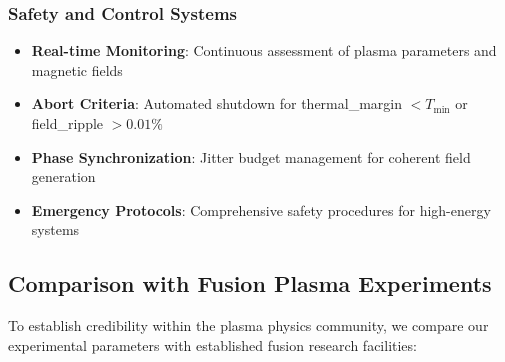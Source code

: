 \documentclass[10pt,twocolumn]{article}
\begin{document}
\subsubsection{Safety and Control Systems}
\begin{itemize}
\item \textbf{Real-time Monitoring}: Continuous assessment of plasma parameters and magnetic fields
\item \textbf{Abort Criteria}: Automated shutdown for thermal\_margin $< T_{\min}$ or field\_ripple $> 0.01\%$
\item \textbf{Phase Synchronization}: Jitter budget management for coherent field generation
\item \textbf{Emergency Protocols}: Comprehensive safety procedures for high-energy systems
\end{itemize}

\subsection{Comparison with Fusion Plasma Experiments}

To establish credibility within the plasma physics community, we compare our experimental parameters with established fusion research facilities:

\begin{table}[htbp]
\centering
\caption{Plasma Parameter Comparison with Major Fusion Facilities}
\label{tab:fusion_comparison}
\par{}
\end{table}
\end{document}
